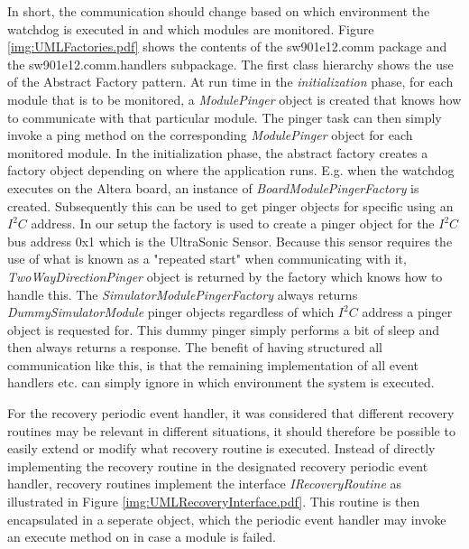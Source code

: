 In short, the communication should change based on which environment the watchdog is executed in and which modules are monitored. Figure \ref{img:UMLFactories.pdf} shows the contents of the sw901e12.comm package and the sw901e12.comm.handlers subpackage.
The first class hierarchy shows the use of the Abstract Factory pattern. At run time in the \emph{initialization} phase, for each module that is to be monitored, a \emph{ModulePinger} object is created that knows how to communicate with that particular module. The pinger task can then simply invoke a ping method on the corresponding \emph{ModulePinger} object for each monitored module. In the initialization phase, the abstract factory creates a factory object depending on where the application runs. E.g. when the watchdog executes on the Altera board, an instance of \emph{BoardModulePingerFactory} is created. Subsequently this can be used to get pinger objects for specific using an $\textit{I}^2\textit{C}$ address. In our setup the factory is used to create a pinger object for the $\textit{I}^2\textit{C}$ bus address 0x1 which is the UltraSonic Sensor. Because this sensor requires the use of what is known as a "repeated start" when communicating with it, \emph{TwoWayDirectionPinger} object is returned by the factory which knows how to handle this.
The \emph{SimulatorModulePingerFactory} always returns \emph{DummySimulatorModule} pinger objects regardless of which $\textit{I}^2\textit{C}$ address a pinger object is requested for. This dummy pinger simply performs a bit of sleep and then always returns a response. The benefit of having structured all communication like this, is that the remaining implementation of all event handlers etc. can simply ignore in which environment the system is executed.

For the recovery periodic event handler, it was considered that different recovery routines may be relevant in different situations, it should therefore be possible to easily extend or modify what recovery routine is executed. Instead of directly implementing the recovery routine in the designated recovery periodic event handler, recovery routines implement the interface \emph{IRecoveryRoutine} as illustrated in Figure \ref{img:UMLRecoveryInterface.pdf}. This routine is then encapsulated in a seperate object, which the periodic event handler may invoke an execute method on in case a module is failed.

